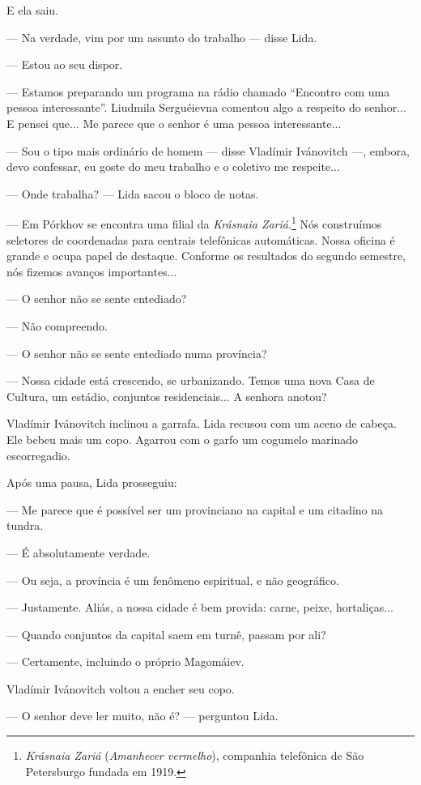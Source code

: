 E ela saiu.

--- Na verdade, vim por um assunto do trabalho --- disse Lida.

--- Estou ao seu dispor.

--- Estamos preparando um programa na rádio chamado ``Encontro com uma
pessoa interessante''. Liudmila Serguéievna comentou algo a respeito do
senhor... E pensei que... Me parece que o senhor é uma pessoa
interessante...

--- Sou o tipo mais ordinário de homem --- disse Vladímir Ivánovitch
---, embora, devo confessar, eu goste do meu trabalho e o coletivo me
respeite...

--- Onde trabalha? --- Lida sacou o bloco de notas.

--- Em Pórkhov se encontra uma filial da \emph{Krásnaia
Zariá}.\footnote{\emph{Krásnaia Zariá} (\emph{Amanhecer vermelho}),
  companhia telefônica de São Petersburgo fundada em 1919.} Nós
construímos seletores de coordenadas para centrais telefônicas
automáticas. Nossa oficina é grande e ocupa papel de destaque. Conforme
os resultados do segundo semestre, nós fizemos avanços importantes...

--- O senhor não se sente entediado?

--- Não compreendo.

--- O senhor não se sente entediado numa província?

--- Nossa cidade está crescendo, se urbanizando. Temos uma nova Casa de
Cultura, um estádio, conjuntos residenciais... A senhora anotou?

Vladímir Ivánovitch inclinou a garrafa. Lida recusou com um aceno de
cabeça. Ele bebeu mais um copo. Agarrou com o garfo um cogumelo marinado
escorregadio.

Após uma pausa, Lida prosseguiu:

--- Me parece que é possível ser um provinciano na capital e um citadino
na tundra.

--- É absolutamente verdade.

--- Ou seja, a província é um fenômeno espiritual, e não geográfico.

--- Justamente. Aliás, a nossa cidade é bem provida: carne, peixe,
hortaliças...

--- Quando conjuntos da capital saem em turnê, passam por ali?

--- Certamente, incluindo o próprio Magomáiev.

Vladímir Ivánovitch voltou a encher seu copo.

--- O senhor deve ler muito, não é? --- perguntou Lida.

